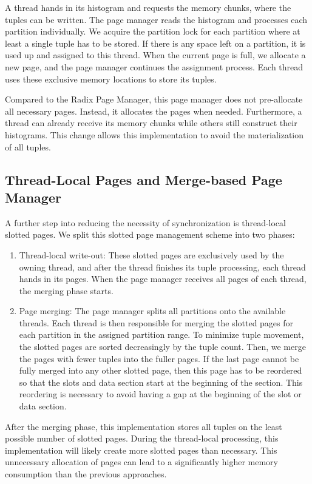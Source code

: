 A thread hands in its histogram and requests the memory chunks, where the tuples can be written.
The page manager reads the histogram and processes each partition individually.
We acquire the partition lock for each partition where at least a single tuple has to be stored.
If there is any space left on a partition, it is used up and assigned to this thread.
When the current page is full, we allocate a new page, and the page manager continues the assignment process.
Each thread uses these exclusive memory locations to store its tuples.

Compared to the Radix Page Manager, this page manager does not pre-allocate all necessary pages.
Instead, it allocates the pages when needed.
Furthermore, a thread can already receive its memory chunks while others still construct their histograms.
This change allows this implementation to avoid the materialization of all tuples.
\subsection{Thread-Local Pages and Merge-based Page Manager}\label{subsection-Thread-Local-Pages-Page-Manager}
A further step into reducing the necessity of synchronization is thread-local slotted pages.
We split this slotted page management scheme into two phases:
\begin{enumerate}
  \item Thread-local write-out: These slotted pages are exclusively used by the owning thread, and after the thread finishes its tuple processing, each thread hands in its pages.
        When the page manager receives all pages of each thread, the merging phase starts.

  \item Page merging: The page manager splits all partitions onto the available threads.
        Each thread is then responsible for merging the slotted pages for each partition in the assigned partition range.
        To minimize tuple movement, the slotted pages are sorted decreasingly by the tuple count.
        Then, we merge the pages with fewer tuples into the fuller pages.
        If the last page cannot be fully merged into any other slotted page, then this page has to be reordered so that the slots and data section start at the beginning of the section.
        This reordering is necessary to avoid having a gap at the beginning of the slot or data section.
\end{enumerate}
After the merging phase, this implementation stores all tuples on the least possible number of slotted pages.
During the thread-local processing, this implementation will likely create more slotted pages than necessary.
This unnecessary allocation of pages can lead to a significantly higher memory consumption than the previous approaches.
